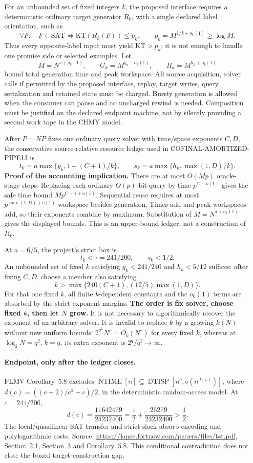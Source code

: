 \documentclass[11pt]{article}
\begin{document}
For an unbounded set of fixed integers $k$, the proposed interface requires
a deterministic ordinary target generator $R_k$, with a single declared
label orientation, such as
\[
 \forall F:\quad F\in\mathrm{SAT}
       \Longleftrightarrow \mathrm{KT}(R_k(F))\leq p_k,
 \qquad p_k=M^{1/k+o_k(1)}\geq\log M.
\]
Thus every opposite-label input must yield $\mathrm{KT}>p_k$; it is not
enough to handle one promise side or selected examples. Let
\[
 M=N^{a+o_k(1)},\qquad
 G_k=M^{g_k+o_k(1)},\qquad H_k=M^{h_k+o_k(1)}
\]
bound total generation time and peak workspace. All source acquisition,
solver calls if permitted by the proposed interface, replay, target writes,
query serialization and retained state must be charged. Bursty generation
is allowed when the consumer can pause and no uncharged rewind is needed.
Composition must be justified on the declared endpoint machine, not by
silently providing a second work tape in the CHMY model.

After $P=NP$ fixes one ordinary query solver with time/space exponents
$C,D$, the conservative source-relative resource ledger used in
COFINAL-AMORTIZED-PIPE13 is
\[
 t_k=a\max\{g_k,1+(C+1)/k\},\qquad
 s_k=a\max\{h_k,\max(1,D)/k\}.
\]
\textbf{Proof of the accounting implication.}
There are at most $O(Mp)$ oracle-stage steps. Replacing each ordinary
$O(p)$-bit query by time $p^{C+o(1)}$ gives the safe time bound
$M p^{C+1+o(1)}$. Sequential reuse requires at most
$p^{\max(1,D)+o(1)}$ workspace besides generation. Times add and peak
workspaces add, so their exponents combine by maximum. Substitution of
$M=N^{a+o_k(1)}$ gives the displayed bounds. This is an upper-bound ledger,
not a construction of $R_k$.

At $a=6/5$, the project's strict box is
\[
 t_k<\tau=241/200,\qquad s_k<1/2.
\]
An unbounded set of fixed $k$ satisfying
$g_k<241/240$ and $h_k<5/12$ suffices: after fixing $C,D$, choose a member
also satisfying
\[
 k>\max\{240(C+1),(12/5)\max(1,D)\}.
\]
For that one fixed $k$, all finite $k$-dependent constants and the
$o_k(1)$ terms are absorbed by the strict exponent margins.
\textbf{The order is fix solver, choose fixed $k$, then let $N$ grow.}
It is not necessary to algorithmically recover the exponent of an arbitrary
solver. It is invalid to replace $k$ by a growing $k(N)$ without new uniform
bounds: $2^{2^k}N^r=O_k(N^r)$ for every fixed $k$, whereas at
$\log_2N=q^2$, $k=q$, its extra exponent is $2^q/q^2\to\infty$.

\paragraph{Endpoint, only after the ledger closes.}
FLMV Corollary~5.8 excludes
$\operatorname{NTIME}[n]\subseteq\operatorname{DTISP}[n^c,o(n^{d(c)})]$,
where $d(c)=((c+2)/c^2-c)/2$, in the deterministic random-access model.
At $c=241/200$,
\[
 d(c)=\frac{11642479}{23232400}
     =\frac12+\frac{26279}{23232400}>\frac12.
\]
The local/quasilinear SAT transfer and strict slack absorb encoding and
polylogarithmic costs. Source:
\url{https://lance.fortnow.com/papers/files/tst.pdf}, Section~2.1,
Section~3 and Corollary~5.8. This conditional contradiction does not close
the boxed target-construction gap.
\end{document}
